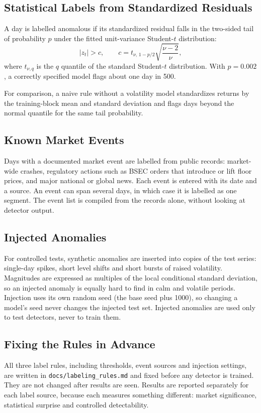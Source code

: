 \subsection{Statistical Labels from Standardized Residuals}
A day is labelled anomalous if its standardized residual falls in the two-sided tail of
probability $p$ under the fitted unit-variance Student-$t$ distribution:
\begin{equation}
|z_t| > c, \qquad c = t_{\nu,\,1-p/2}\sqrt{\frac{\nu-2}{\nu}} ,
\end{equation}
where $t_{\nu,q}$ is the $q$ quantile of the standard Student-$t$ distribution. With
$p = 0.002$, a correctly specified model flags about one day in 500.

For comparison, a naive rule without a volatility model standardizes returns by the
training-block mean and standard deviation and flags days beyond the normal quantile for
the same tail probability.

\subsection{Known Market Events}
Days with a documented market event are labelled from public records: market-wide crashes,
regulatory actions such as BSEC orders that introduce or lift floor prices, and major
national or global news. Each event is entered with its date and a source. An event can
span several days, in which case it is labelled as one segment. The event list is compiled
from the records alone, without looking at detector output.

\subsection{Injected Anomalies}
For controlled tests, synthetic anomalies are inserted into copies of the test series:
single-day spikes, short level shifts and short bursts of raised volatility. Magnitudes are
expressed as multiples of the local conditional standard deviation, so an injected anomaly
is equally hard to find in calm and volatile periods. Injection uses its own random seed
(the base seed plus 1000), so changing a model's seed never changes the injected test set.
Injected anomalies are used only to test detectors, never to train them.

\subsection{Fixing the Rules in Advance}
All three label rules, including thresholds, event sources and injection settings, are
written in \texttt{docs/labeling\_rules.md} and fixed before any detector is trained. They
are not changed after results are seen. Results are reported separately for each label
source, because each measures something different: market significance, statistical
surprise and controlled detectability.

